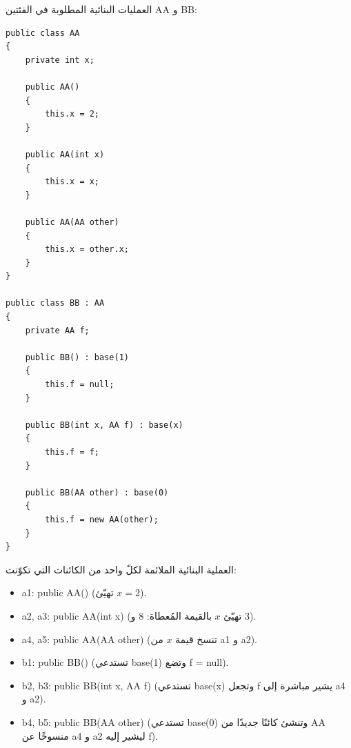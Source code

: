 \def\bagrutTocEntry{\phantomsection\addcontentsline{toc}{subsection}{\texorpdfstring{سؤال $16$ امتحان $\mathrm{899271}$ سنة $2024$}{سؤال 16 امتحان 899271 سنة 2024}}\global\let\bagrutTocEntry\relax}%



\ifwithsols
\begin{boxSolution}
العمليات البنائية المطلوبة في الفئتين \textenglish{AA} و \textenglish{BB}:
\begin{boxCode}
\begin{english}
\begin{verbatim}
public class AA
{
    private int x;

    public AA()
    {
        this.x = 2;
    }

    public AA(int x)
    {
        this.x = x;
    }

    public AA(AA other)
    {
        this.x = other.x;
    }
}

public class BB : AA
{
    private AA f;

    public BB() : base(1)
    {
        this.f = null;
    }

    public BB(int x, AA f) : base(x)
    {
        this.f = f;
    }

    public BB(AA other) : base(0)
    {
        this.f = new AA(other);
    }
}
\end{verbatim}
\end{english}
\end{boxCode}
\end{boxSolution}

\filbreak

\begin{boxSolution}
العملية البنائية الملائمة لكلّ واحد من الكائنات التي تكوّنت:
\begin{itemize}[itemsep=0.35em]
    \item \textenglish{a1}: \textenglish{public AA()} (تهيّئ $x = 2$).
    \item \textenglish{a2, a3}: \textenglish{public AA(int x)} (تهيّئ $x$ بالقيمة المُعطاة: $8$ و $3$).
    \item \textenglish{a4, a5}: \textenglish{public AA(AA other)} (تنسخ قيمة $x$ من \textenglish{a1} و \textenglish{a2}).
    \item \textenglish{b1}: \textenglish{public BB()} (تستدعي \textenglish{base(1)} وتضع \textenglish{f = null}).
    \item \textenglish{b2, b3}: \textenglish{public BB(int x, AA f)} (تستدعي \textenglish{base(x)} وتجعل \textenglish{f} يشير مباشرة إلى \textenglish{a4} و \textenglish{a2}).
    \item \textenglish{b4, b5}: \textenglish{public BB(AA other)} (تستدعي \textenglish{base(0)} وتنشئ كائنًا جديدًا من \textenglish{AA} منسوخًا عن \textenglish{a4} و \textenglish{a2} ليشير إليه \textenglish{f}).
\end{itemize}
\end{boxSolution}
\fi
\filbreak
